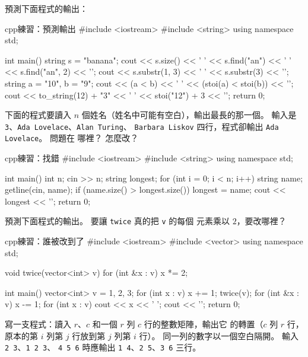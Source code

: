 \begin{drills}[label=drills:ch3]
\item 預測下面程式的輸出：
\begin{code}{cpp}{練習：預測輸出}
#include <iostream>
#include <string>
using namespace std;

int main() {
    string s = "banana";
    cout << s.size() << ' ' << s.find("an") << ' ' << s.find("an", 2) << '\n';
    cout << s.substr(1, 3) << ' ' << s.substr(3) << '\n';
    string a = "10", b = "9";
    cout << (a < b) << ' ' << (stoi(a) < stoi(b)) << '\n';
    cout << to_string(12) + "3" << ' ' << stoi("12") + 3 << '\n';
    return 0;
}
\end{code}
\item 下面的程式要讀入 $n$ 個姓名（姓名中可能有空白），輸出最長的那一個。
輸入是 \texttt{3}、\texttt{Ada Lovelace}、\texttt{Alan Turing}、
\texttt{Barbara Liskov} 四行，程式卻輸出 \texttt{Ada Lovelace}。 問題在
哪裡？ 怎麼改？
\begin{code}{cpp}{練習：找錯}
#include <iostream>
#include <string>
using namespace std;

int main() {
    int n;
    cin >> n;
    string longest;
    for (int i = 0; i < n; i++) {
        string name;
        getline(cin, name);
        if (name.size() > longest.size()) {
            longest = name;
        }
    }
    cout << longest << '\n';
    return 0;
}
\end{code}
\item 預測下面程式的輸出。 要讓 \texttt{twice} 真的把 \texttt{v} 的每個
元素乘以 $2$，要改哪裡？
\begin{code}{cpp}{練習：誰被改到了}
#include <iostream>
#include <vector>
using namespace std;

void twice(vector<int> v) {
    for (int &x : v) {
        x *= 2;
    }
}

int main() {
    vector<int> v = {1, 2, 3};
    for (int x : v) {
        x += 1;
    }
    twice(v);
    for (int &x : v) {
        x -= 1;
    }
    for (int x : v) {
        cout << x << ' ';
    }
    cout << '\n';
    return 0;
}
\end{code}
\item 寫一支程式：讀入 $r$、$c$ 和一個 $r$ 列 $c$ 行的整數矩陣，輸出它
的轉置（$c$ 列 $r$ 行，原本的第 $i$ 列第 $j$ 行放到第 $j$ 列第 $i$ 行）。
同一列的數字以一個空白隔開。 輸入 \texttt{2 3}、\texttt{1 2 3}、
\texttt{4 5 6} 時應輸出 \texttt{1 4}、\texttt{2 5}、\texttt{3 6} 三行。
\end{drills}

